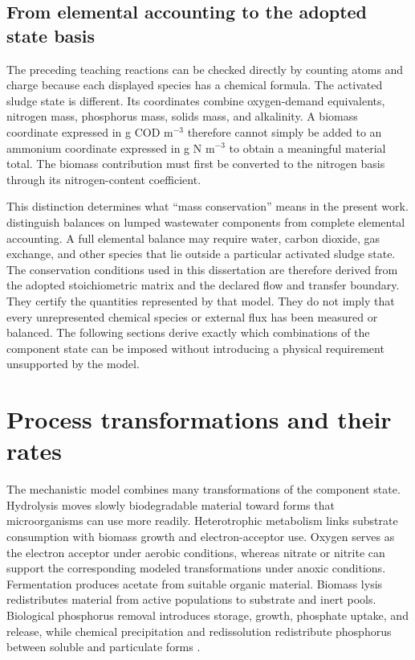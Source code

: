 \subsection{From elemental accounting to the adopted state basis}

The preceding teaching reactions can be checked directly by counting atoms and charge because each displayed species has a chemical formula. The activated sludge state is different. Its coordinates combine oxygen-demand equivalents, nitrogen mass, phosphorus mass, solids mass, and alkalinity. A biomass coordinate expressed in g COD m$^{-3}$ therefore cannot simply be added to an ammonium coordinate expressed in g N m$^{-3}$ to obtain a meaningful material total. The biomass contribution must first be converted to the nitrogen basis through its nitrogen-content coefficient.

This distinction determines what ``mass conservation'' means in the present work. \citet{TakacsVanrolleghem2006} distinguish balances on lumped wastewater components from complete elemental accounting. A full elemental balance may require water, carbon dioxide, gas exchange, and other species that lie outside a particular activated sludge state. The conservation conditions used in this dissertation are therefore derived from the adopted stoichiometric matrix and the declared flow and transfer boundary. They certify the quantities represented by that model. They do not imply that every unrepresented chemical species or external flux has been measured or balanced. The following sections derive exactly which combinations of the component state can be imposed without introducing a physical requirement unsupported by the model.

\section{Process transformations and their rates}

The mechanistic model combines many transformations of the component state. Hydrolysis moves slowly biodegradable material toward forms that microorganisms can use more readily. Heterotrophic metabolism links substrate consumption with biomass growth and electron-acceptor use. Oxygen serves as the electron acceptor under aerobic conditions, whereas nitrate or nitrite can support the corresponding modeled transformations under anoxic conditions. Fermentation produces acetate from suitable organic material. Biomass lysis redistributes material from active populations to substrate and inert pools. Biological phosphorus removal introduces storage, growth, phosphate uptake, and release, while chemical precipitation and redissolution redistribute phosphorus between soluble and particulate forms \citep{Henze2006,Guerrero2011}.

